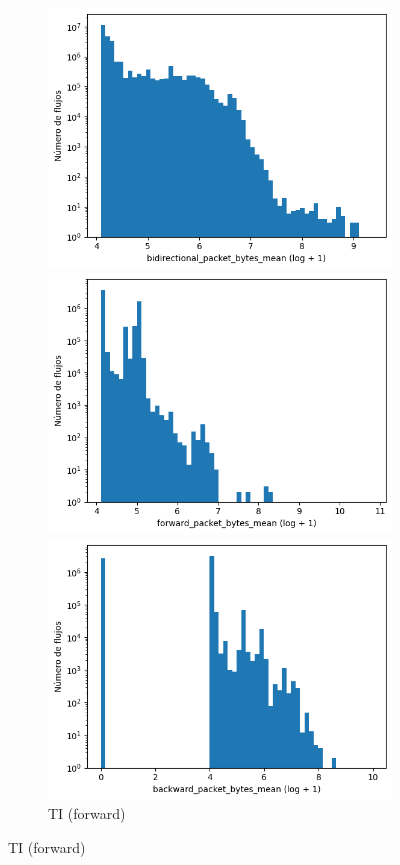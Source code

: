 \begin{figure}[H]
\begin{subfigure}[b]{0.26\textwidth}
        \includegraphics[width=\linewidth]{media/packet_pincer_toniot/bidirectional_packet_bytes_mean_log_x_log_y.png}
        \caption{TI (bidir.)}
        \includegraphics[width=\textwidth]{media/packet_pincer_botiot/forward_packet_bytes_mean_log_x_log_y.png}
        \caption{TI (forward)}
        \includegraphics[width=\textwidth]{media/packet_pincer_botiot/backward_packet_bytes_mean_log_x_log_y.png}

\end{subfigure}
\end{figure}
